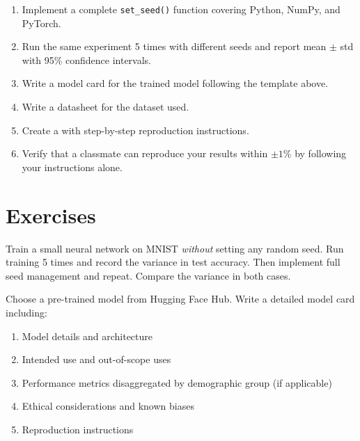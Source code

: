 \begin{miniproject}[title=\textbf{Mini-project 11: Reproducibility}]
\begin{enumerate}
  \item Implement a complete \texttt{set\_seed()} function covering
    Python, NumPy, and PyTorch.
  \item Run the same experiment 5 times with different seeds and
    report mean $\pm$ std with 95\% confidence intervals.
  \item Write a model card for the trained model following the
    template above.
  \item Write a datasheet for the dataset used.
  \item Create a  with step-by-step reproduction
    instructions.
  \item Verify that a classmate can reproduce your results within
    $\pm 1\%$ by following your instructions alone.
\end{enumerate}
\end{miniproject}

\section{Exercises}
\label{sec:exercises-ch11}

\begin{exercise}
Train a small neural network on MNIST \emph{without} setting any
random seed. Run training 5 times and record the variance in test
accuracy. Then implement full seed management and repeat. Compare the
variance in both cases.
\end{exercise}

\begin{exercise}
Choose a pre-trained model from Hugging Face Hub. Write a detailed
model card including:
\begin{enumerate}
  \item Model details and architecture
  \item Intended use and out-of-scope uses
  \item Performance metrics disaggregated by demographic group (if
    applicable)
  \item Ethical considerations and known biases
  \item Reproduction instructions
\end{enumerate}
\end{exercise}

